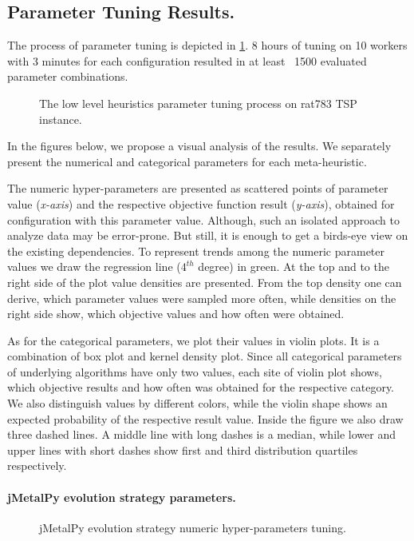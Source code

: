 \subsection{Parameter Tuning Results.} 
The process of parameter tuning is depicted in \cref{eval:pict:mh tuning}. 8 hours of tuning on 10 workers with 3 minutes for each configuration resulted in at least ~1500 evaluated parameter combinations. 

\begin{figure}[h!]
	\centering
	
	\caption{The low level heuristics parameter tuning process on rat783 TSP instance.}
	\label{eval:pict:mh tuning}
\end{figure}

In the figures below, we propose a visual analysis of the results. We separately present the numerical and categorical parameters for each meta-heuristic.

The numeric hyper-parameters are presented as scattered points of parameter value (\emph{x-axis}) and the respective objective function result (\emph{y-axis}), obtained for configuration with this parameter value. Although, such an isolated approach to analyze data may be error-prone. But still, it is enough to get a birds-eye view on the existing dependencies. To represent trends among the numeric parameter values we draw the regression line ($4^{th}$ degree) in green. At the top and to the right side of the plot value densities are presented. From the top density one can derive, which parameter values were sampled more often, while densities on the right side show, which objective values and how often were obtained. 

As for the categorical parameters, we plot their values in violin plots. It is a combination of box plot and kernel density plot. Since all categorical parameters of underlying algorithms have only two values, each site of violin plot shows, which objective results and how often was obtained for the respective category. We also distinguish values by different colors, while the violin shape shows an expected probability of the respective result value. Inside the figure we also draw three dashed lines. A middle line with long dashes is a median, while lower and upper lines with short dashes show first and third distribution quartiles respectively.


\paragraph{jMetalPy evolution strategy parameters.}
\begin{figure}[h!]
	\centering
	\vspace{-20pt}
	
	\caption{jMetalPy evolution strategy numeric hyper-parameters tuning.}
	\label{eval:pict:jmetalpy es numeric}
	\vspace{-15pt}
\end{figure}

